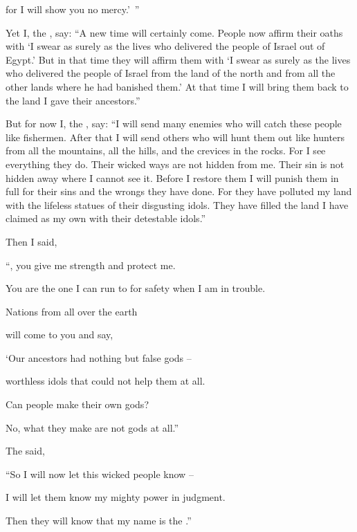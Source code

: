 {for I will show you no
mercy.’ ”
\par }{\PP {}Yet I, the
{}, say: “A new time
will certainly
come.
People now affirm
their oaths
with ‘I swear as surely
as the
{}
lives who
delivered
the
people of Israel
out of Egypt.’
But in that
time they will affirm them with ‘I swear as surely
as the
{}
lives who
delivered
the people of Israel
from the land
of the north
and from all
the other lands
where
he
had
banished
them.’ At that
time I will bring them back
to the land
I gave
their ancestors.”
\par }{\PP {}But for now
I, the
{}, say: “I will send
many
enemies
who will catch these people like fishermen.
After
that
I will send
others
who will hunt
them out like hunters
from
all
the mountains,
all
the hills,
and the crevices
in the rocks.
For
I see
everything
they do. Their wicked
ways
are not
hidden
from me. Their sin
is not hidden
away where I cannot
see it.
Before
I restore them I will punish
them in full
for their sins
and the wrongs
they have done. For
they have polluted
my land
with the lifeless statues
of their disgusting idols.
They have filled
the land I have claimed
as my own with their detestable idols.”
\par }{\PP {}Then I said,

\par }{\Q “{}, you give me strength
and protect
me.
\par }{\Q You are the one
I can
run
to for safety when
I am in trouble.
\par }{\Q Nations
from all
over the earth
\par }{\Q will come
to you and say,
\par }{\Q ‘Our
ancestors
had nothing but false gods –
\par }{\Q worthless idols that could not help them at all.
\par }{\Q {}Can
people
make
their own gods?
\par }{\Q No, what
they
make
are not
gods at all.”
\par }{\PP {}The
{} said,

\par }{\Q “So
I
will now
let
this wicked people know
–
\par }{\Q I will let them know
my
mighty
power
in judgment.
\par }{\Q Then they will know
that
my name
is the
{}.”

}
